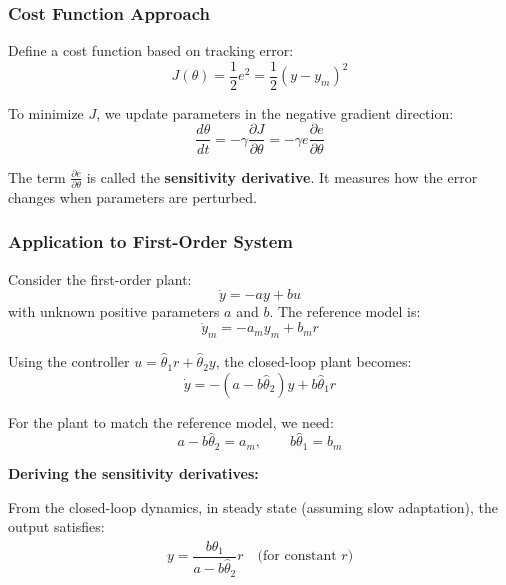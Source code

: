 \subsubsection{Cost Function Approach}

Define a cost function based on tracking error:
\begin{equation}
J(\theta) = \frac{1}{2}e^2 = \frac{1}{2}(y - y_m)^2
\label{eq:mit_cost}
\end{equation}

To minimize $J$, we update parameters in the negative gradient direction:
\begin{equation}
\frac{d\theta}{dt} = -\gamma \frac{\partial J}{\partial \theta} = -\gamma e \frac{\partial e}{\partial \theta}
\label{eq:mit_rule_derivation}
\end{equation}

The term $\frac{\partial e}{\partial \theta}$ is called the \textbf{sensitivity derivative}. It measures how the error changes when parameters are perturbed.

\subsubsection{Application to First-Order System}

Consider the first-order plant:
\begin{equation}
\dot{y} = -ay + bu
\label{eq:first_order_plant}
\end{equation}
with unknown positive parameters $a$ and $b$. The reference model is:
\begin{equation}
\dot{y}_m = -a_m y_m + b_m r
\label{eq:first_order_ref}
\end{equation}

Using the controller $u = \hat{\theta}_1 r + \hat{\theta}_2 y$, the closed-loop plant becomes:
\begin{equation}
\dot{y} = -(a - b\hat{\theta}_2)y + b\hat{\theta}_1 r
\label{eq:closed_loop_first}
\end{equation}

For the plant to match the reference model, we need:
\begin{equation}
a - b\hat{\theta}_2 = a_m, \qquad b\hat{\theta}_1 = b_m
\label{eq:matching_conditions}
\end{equation}

\textbf{Deriving the sensitivity derivatives:}

From the closed-loop dynamics, in steady state (assuming slow adaptation), the output satisfies:
\begin{equation}
y = \frac{b\hat{\theta}_1}{a - b\hat{\theta}_2}r \quad \text{(for constant } r\text{)}
\label{eq:steady_state}
\end{equation}

